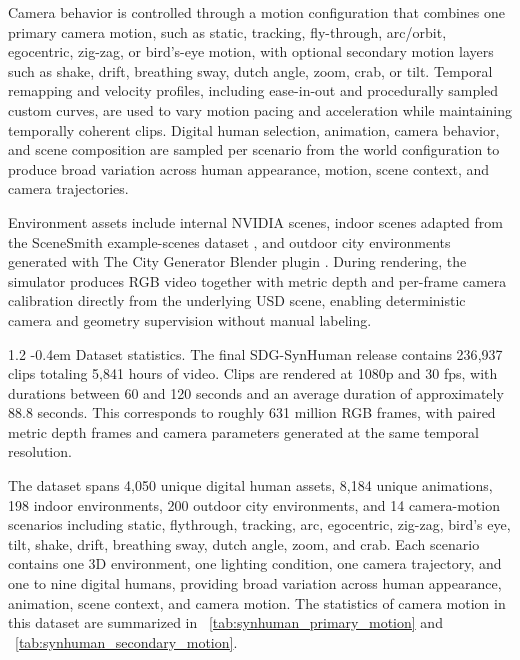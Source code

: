 \documentclass{llmxive}
\makeatletter
\providecommand{\paragraph}{  \@startsection{paragraph}{4}{\z@}    {1\baselineskip \@plus .2\baselineskip}    {-0.4em}    {\normalfont\normalsize\bfseries}}
\makeatother
\begin{document}
Camera behavior is controlled through a motion configuration that combines one primary camera motion, such as static, tracking, fly-through, arc/orbit, egocentric, zig-zag, or bird's-eye motion, with optional secondary motion layers such as shake, drift, breathing sway, dutch angle, zoom, crab, or tilt. Temporal remapping and velocity profiles, including ease-in-out and procedurally sampled custom curves, are used to vary motion pacing and acceleration while maintaining temporally coherent clips. Digital human selection, animation, camera behavior, and scene composition are sampled per scenario from the world configuration to produce broad variation across human appearance, motion, scene context, and camera trajectories.

Environment assets include internal NVIDIA scenes, indoor scenes adapted from the SceneSmith example-scenes dataset \citep{pfaff2026scenesmith}, and outdoor city environments generated with The City Generator Blender plugin \citep{durr2026citygenerator}. During rendering, the simulator produces RGB video together with metric depth and per-frame camera calibration directly from the underlying USD scene, enabling deterministic camera and geometry supervision without manual labeling.

\paragraph{Dataset statistics.}
\label{appendix:sdg_synhuman_dataset_statistics}
The final SDG-SynHuman release contains 236{,}937 clips totaling 5{,}841 hours of video. Clips are rendered at 1080p and 30 fps, with durations between 60 and 120 seconds and an average duration of approximately 88.8 seconds. This corresponds to roughly 631 million RGB frames, with paired metric depth frames and camera parameters generated at the same temporal resolution.

The dataset spans 4{,}050 unique digital human assets, 8{,}184 unique animations, 198 indoor environments, 200 outdoor city environments, and 14 camera-motion scenarios including static, flythrough, tracking, arc, egocentric, zig-zag, bird's eye, tilt, shake, drift, breathing sway, dutch angle, zoom, and crab. Each scenario contains one 3D environment, one lighting condition, one camera trajectory, and one to nine digital humans, providing broad variation across human appearance, animation, scene context, and camera motion. The statistics of camera motion in this dataset are summarized in ~\cref{tab:synhuman_primary_motion} and ~\cref{tab:synhuman_secondary_motion}.
\end{document}
